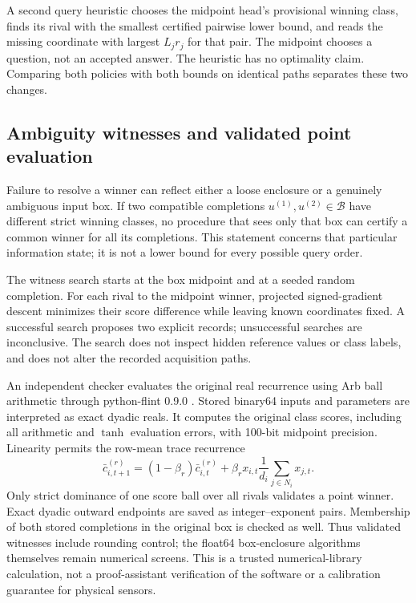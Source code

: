\documentclass[11pt,a4paper]{article}
\theoremstyle{definition}\newtheorem{definition}[theorem]{Definition}
\begin{document}
A second query heuristic chooses the midpoint head's provisional winning class, finds its rival with the smallest certified pairwise lower bound, and reads the missing coordinate with largest $L_jr_j$ for that pair. The midpoint chooses a question, not an accepted answer. The heuristic has no optimality claim. Comparing both policies with both bounds on identical paths separates these two changes.

\subsection{Ambiguity witnesses and validated point evaluation}\label{sec:witness}
Failure to resolve a winner can reflect either a loose enclosure or a genuinely ambiguous input box. If two compatible completions $u^{(1)},u^{(2)}\in\mathcal B$ have different strict winning classes, no procedure that sees only that box can certify a common winner for all its completions. This statement concerns that particular information state; it is not a lower bound for every possible query order.

The witness search starts at the box midpoint and at a seeded random completion. For each rival to the midpoint winner, projected signed-gradient descent minimizes their score difference while leaving known coordinates fixed. A successful search proposes two explicit records; unsuccessful searches are inconclusive. The search does not inspect hidden reference values or class labels, and does not alter the recorded acquisition paths.

An independent checker evaluates the original real recurrence using Arb ball arithmetic through python-flint 0.9.0 \cite{johansson2017,pythonflint}. Stored binary64 inputs and parameters are interpreted as exact dyadic reals. It computes the original class scores, including all arithmetic and $\tanh$ evaluation errors, with 100-bit midpoint precision. Linearity permits the row-mean trace recurrence
\[
 \bar c^{(r)}_{i,t+1}=(1-\beta_r)\bar c^{(r)}_{i,t}
 +\beta_rx_{i,t}\frac1{d_i}\sum_{j\in N_i}x_{j,t}.
\]
Only strict dominance of one score ball over all rivals validates a point winner. Exact dyadic outward endpoints are saved as integer--exponent pairs. Membership of both stored completions in the original box is checked as well. Thus validated witnesses include rounding control; the float64 box-enclosure algorithms themselves remain numerical screens. This is a trusted numerical-library calculation, not a proof-assistant verification of the software or a calibration guarantee for physical sensors.
\end{document}
